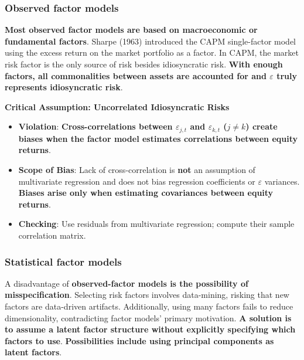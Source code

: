 \documentclass[12pt,a4paper]{article}
\begin{document}
\subsubsection{Observed factor models}

\textbf{Most observed factor models are based on macroeconomic or fundamental factors}. Sharpe (1963) introduced the CAPM single-factor model using the excess return on the market portfolio as a factor. In CAPM, the market risk factor is the only source of risk besides idiosyncratic risk. 
\textbf{With enough factors, all commonalities between assets are accounted for and $\varepsilon$ truly represents idiosyncratic risk}. 

\vspace{0.5em}

\textbf{Critical Assumption: Uncorrelated Idiosyncratic Risks}

\begin{itemize}
    \item \textbf{Violation}: \textbf{Cross-correlations between $\varepsilon_{j,t}$ and $\varepsilon_{k,t}$ ($j \neq k$) create biases when the factor model estimates correlations between equity returns}.
    
    \item \textbf{Scope of Bias}: Lack of cross-correlation is \textbf{not} an assumption of multivariate regression and does not bias regression coefficients or $\varepsilon$ variances. \textbf{Biases arise only when estimating covariances between equity returns}.
    
    \item \textbf{Checking}: Use residuals from multivariate regression; compute their sample correlation matrix.
\end{itemize}

\subsubsection{Statistical factor models}

A disadvantage of \textbf{observed-factor models is the possibility of misspecification}. Selecting risk factors involves data-mining, risking that new factors are data-driven artifacts. Additionally, using many factors fails to reduce dimensionality, contradicting factor models' primary motivation. \textbf{A solution is to assume a latent factor structure without explicitly specifying which factors to use}. \textbf{Possibilities include using principal components as latent factors}.
\end{document}

